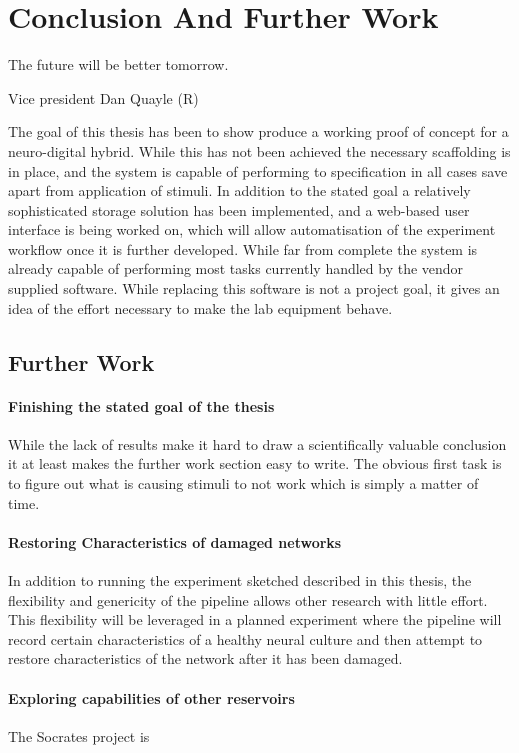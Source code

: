 \chapter{Conclusion And Further Work}
\epigraph{The future will be better tomorrow.}
{Vice president Dan Quayle (R)}
The goal of this thesis has been to show produce a working proof of concept for
a neuro-digital hybrid.
While this has not been achieved the necessary scaffolding is in place, and the
system is capable of performing to specification in all cases save apart from
application of stimuli.
In addition to the stated goal a relatively sophisticated storage solution has
been implemented, and a web-based user interface is being worked on, which will
allow automatisation of the experiment workflow once it is further developed.
While far from complete the system is already capable of performing most tasks
currently handled by the vendor supplied software.
While replacing this software is not a project goal, it gives an idea of the
effort necessary to make the lab equipment behave.
\section{Further Work}
\subsubsection{Finishing the stated goal of the thesis}
While the lack of results make it hard to draw a scientifically valuable
conclusion it at least makes the further work section easy to write.
The obvious first task is to figure out what is causing stimuli to not work
which is simply a matter of time.
\subsubsection{Restoring Characteristics of damaged networks}
In addition to running the experiment sketched described in this thesis, the
flexibility and genericity of the pipeline allows other research with little
effort.
This flexibility will be leveraged in a planned experiment where the pipeline
will record certain characteristics of a healthy neural culture and then attempt
to restore characteristics of the network after it has been damaged.
\subsubsection{Exploring capabilities of other reservoirs}
The Socrates project is
